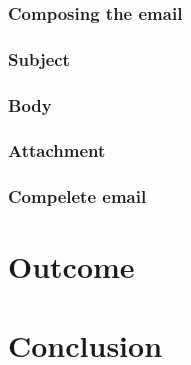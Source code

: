\documentclass{article}
\begin{document}
\subsubsection{Composing the email}
\label{subsub:composing_the_email}

\subsubsection{Subject}
\label{subsub:subject}

\subsubsection{Body}
\label{subsub:body}

\subsubsection{Attachment}
\label{subsub:attachment}

\subsubsection{Compelete email}
\label{subsub:complete_email}


\section{Outcome} %
\label{sec:outcome}



\section{Conclusion} %
\label{sec:conclusion}


\end{document}

